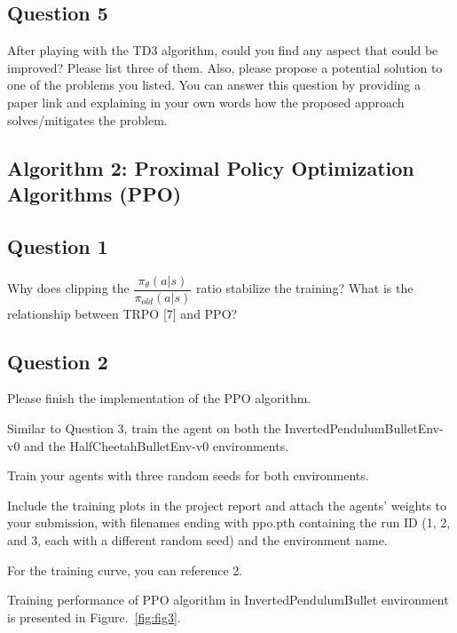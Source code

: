 \documentclass[12pt]{article}
\begin{document}
\subsection*{Question 5}

After playing with the TD3 algorithm, could you find any aspect that could be improved? Please
list three of them. Also, please propose a potential solution to one of the problems you listed.
You can answer this question by providing a paper link and explaining in your own words how
the proposed approach solves/mitigates the problem.

\pagebreak

\subsection*{Algorithm 2: Proximal Policy Optimization Algorithms (PPO)}

\subsection*{Question 1}

Why does clipping the $\dfrac{\pi_{\theta}(a|s)}{\pi_{old}(a|s)}$ ratio stabilize the training? What is the relationship between TRPO [7] and PPO?

\subsection*{Question 2}

Please finish the implementation of the PPO algorithm.
\newline

\noindent
Similar to Question 3, train the agent on both the InvertedPendulumBulletEnv-v0 and the HalfCheetahBulletEnv-v0 environments.
\newline

\noindent
Train your agents with three random seeds for both environments. 
\newline

\noindent
Include the training plots in the project report and attach the agents’ weights to your submission, with filenames ending with ppo.pth containing the run ID (1, 2, and 3, each with a different random seed) and the environment name. 
\newline

\noindent
For the training curve, you can reference 2. 


Training performance of PPO algorithm in InvertedPendulumBullet environment is presented in Figure.~\ref*{fig:fig3}.
\newline
\end{document}

